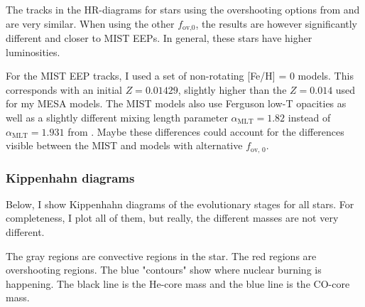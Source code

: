 \documentclass[a4paper,10pt]{article}
\begin{document}
\begin{figure}[ht]
    \centering
\end{figure}

\begin{figure}[ht]
    \centering
\end{figure}

\nextpage

\begin{figure}[ht]
    \centering
\end{figure}

The tracks in the HR-diagrams for stars using the overshooting options from \citet{rees2024b} and \citet{temmink2022} are very similar. When using the other \(f _\text{ov,0}\), the results are however significantly different and closer to MIST EEPs. In general, these stars have higher luminosities.

For the MIST \citep{choi2016} EEP tracks, I used a set of non-rotating [Fe/H] = 0 models. This corresponds with an initial \(Z=0.01429\), slightly higher than the \(Z=0.014\) used for my MESA models. The MIST models also use Ferguson low-T opacities as well as a slightly different mixing length parameter \(\alpha _\text{MLT} = 1.82\) instead of \(\alpha _\text{MLT} = 1.931\) from \citet{cinquegrana2022}. Maybe these differences could account for the differences visible between the MIST and \citet{temmink2022} models with alternative \(f _\text{ov, 0}\).


\subsubsection{Kippenhahn diagrams}

Below, I show Kippenhahn diagrams of the evolutionary stages for all stars.
For completeness, I plot all of them, but really, the different masses are not very different.

The gray regions are convective regions in the star. The red regions are overshooting regions. The blue "contours" show where nuclear burning is happening. The black line is the He-core mass and the blue line is the CO-core mass.
\end{document}
